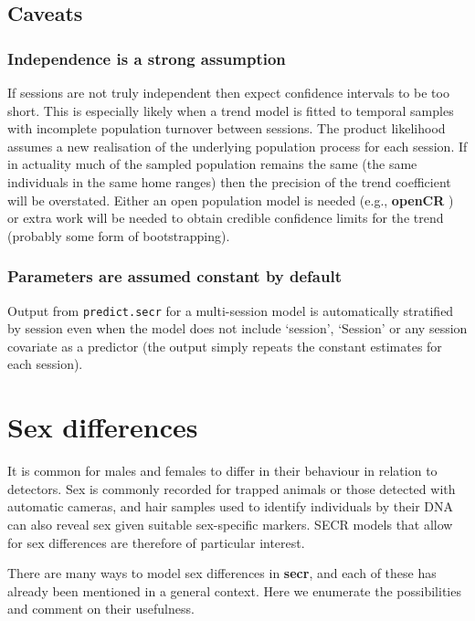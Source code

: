 \documentclass[
]{book}
\begin{document}
\section{Caveats}\label{caveats}

\subsection{Independence is a strong assumption}\label{independence-is-a-strong-assumption}

If sessions are not truly independent then expect confidence intervals to be too short. This is especially likely when a trend model is fitted to temporal samples with incomplete population turnover between sessions. The product likelihood assumes a new realisation of the underlying population process for each session. If in actuality much of the sampled population remains the same (the same individuals in the same home ranges) then the precision of the trend coefficient will be overstated. Either an open population model is needed (e.g., \textbf{openCR} \citep{es20}) or extra work will be needed to obtain credible confidence limits for the trend (probably some form of bootstrapping).

\subsection{Parameters are assumed constant by default}\label{parameters-are-assumed-constant-by-default}

Output from \texttt{predict.secr} for a multi-session model is automatically stratified by session even when the model does not include `session', `Session' or any session covariate as a predictor (the output simply repeats the constant estimates for each session).

\chapter{Sex differences}\label{sex}

It is common for males and females to differ in their behaviour in relation to detectors. Sex is commonly recorded for trapped animals or those detected with automatic cameras, and hair samples used to identify individuals by their DNA can also reveal sex given suitable sex-specific markers. SECR models that allow for sex differences are therefore of particular interest.

There are many ways to model sex differences in \textbf{secr}, and each of these has already been mentioned in a general context. Here we enumerate the possibilities and comment on their usefulness.
\end{document}
